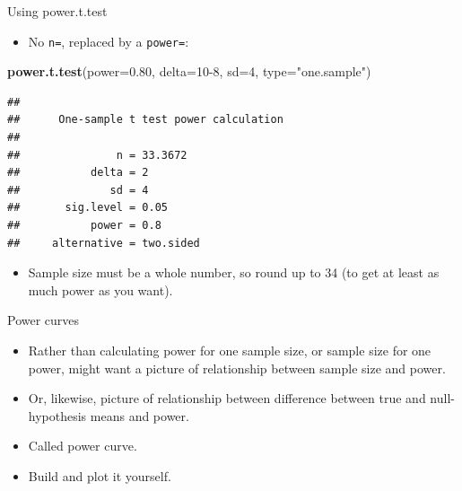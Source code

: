 \documentclass[ignorenonframetext,]{beamer}
\newenvironment{Shaded}{\begin{snugshade}}{\end{snugshade}}
\newcommand{\DataTypeTok}[1]{\textcolor[rgb]{0.13,0.29,0.53}{#1}}
\newcommand{\DecValTok}[1]{\textcolor[rgb]{0.00,0.00,0.81}{#1}}
\newcommand{\FloatTok}[1]{\textcolor[rgb]{0.00,0.00,0.81}{#1}}
\newcommand{\KeywordTok}[1]{\textcolor[rgb]{0.13,0.29,0.53}{\textbf{#1}}}
\newcommand{\NormalTok}[1]{#1}
\newcommand{\StringTok}[1]{\textcolor[rgb]{0.31,0.60,0.02}{#1}}
\providecommand{\tightlist}{%
  \setlength{\itemsep}{0pt}\setlength{\parskip}{0pt}}
\begin{document}
\begin{frame}[fragile]{Using power.t.test}
\protect\hypertarget{using-power.t.test}{}

\begin{itemize}
\tightlist
\item
  No \texttt{n=}, replaced by a \texttt{power=}:
\end{itemize}

\begin{Shaded}
\begin{Highlighting}[]
\KeywordTok{power.t.test}\NormalTok{(}\DataTypeTok{power=}\FloatTok{0.80}\NormalTok{, }\DataTypeTok{delta=}\DecValTok{10-8}\NormalTok{, }\DataTypeTok{sd=}\DecValTok{4}\NormalTok{, }\DataTypeTok{type=}\StringTok{"one.sample"}\NormalTok{)}
\end{Highlighting}
\end{Shaded}

\begin{verbatim}
## 
##      One-sample t test power calculation 
## 
##               n = 33.3672
##           delta = 2
##              sd = 4
##       sig.level = 0.05
##           power = 0.8
##     alternative = two.sided
\end{verbatim}

\begin{itemize}
\tightlist
\item
  Sample size must be a whole number, so round up to 34 (to get at least
  as much power as you want).
\end{itemize}

\end{frame}

\begin{frame}{Power curves}
\protect\hypertarget{power-curves}{}

\begin{itemize}
\tightlist
\item
  Rather than calculating power for one sample size, or sample size for
  one power, might want a picture of relationship between sample size
  and power.
\item
  Or, likewise, picture of relationship between difference between true
  and null-hypothesis means and power.
\item
  Called power curve.
\item
  Build and plot it yourself.
\end{itemize}

\end{frame}
\end{document}

